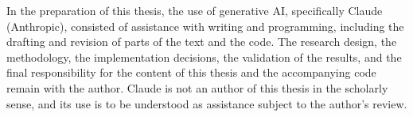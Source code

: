 
In the preparation of this thesis, the use of generative AI, specifically Claude (Anthropic), consisted of assistance
with writing and programming, including the drafting and revision of parts of the text and the code. The research
design, the methodology, the implementation decisions, the validation of the results, and the final responsibility for
the content of this thesis and the accompanying code remain with the author. Claude is not an author of this thesis in
the scholarly sense, and its use is to be understood as assistance subject to the author's review.
